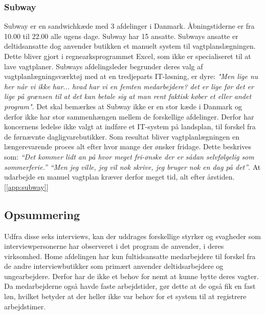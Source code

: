 \subsubsection{Subway}
Subway er en sandwichkæde med 3 afdelinger i Danmark. Åbningstiderne er fra 10.00 til 22.00 alle ugens dage. Subway har 15 ansatte. Subways ansatte er deltidsansatte dog anvender butikken et manuelt system til vagtplanslægningen. Dette bliver gjort i regnearksprogrammet Excel, som ikke er specialiseret til at lave vagtplaner. Subways afdelingsleder begrunder deres valg af vagtplanlægningsværktøj med at en tredjeparts IT-løsning, er dyre: \textit{"Men lige nu her når vi ikke har... hvad har vi en femten medarbejdere? det er lige før det er lige på grænsen til at det kan betale sig at man rent faktisk køber et eller andet program"}.
Det skal bemærkes at Subway ikke er en stor kæde i Danmark og derfor ikke har stor sammenhængen mellem de forskellige afdelinger. Derfor har koncernens ledelse ikke valgt at indføre et IT-system på landsplan, til forskel fra de førnævnte dagligvarebutikker. Som resultat bliver vagtplanlægningen en længerevarende proces alt efter hvor mange der ønsker fridage. Dette beskrives som: \textit{“Det kommer lidt an på hvor meget fri-ønske der er sådan selvfølgelig som sommerferie.” “Men jeg ville, jeg vil nok skrive, jeg bruger nok en dag på det”}. At udarbejde en manuel vagtplan kræver derfor meget tid, alt efter årstiden. [\ref{app:subway}]

\subsection{Opsummering}
Udfra disse seks interviews, kan der uddrages forskellige styrker og svagheder som interviewpersonerne har observeret i det program de anvender, i deres virksomhed. Home afdelingen har kun fultidsansatte medarbejdere til forskel fra de andre interviewbutikker som primært anvender deltidsarbejdere og ungearbejdere. Derfor har de ikke et behov for nemt at kunne bytte deres vagter. Da medarbejderne også havde faste arbejdstider, gør dette at de også fik en fast løn, hvilket betyder at der heller ikke var behov for et system til at registrere arbejdstimer.

